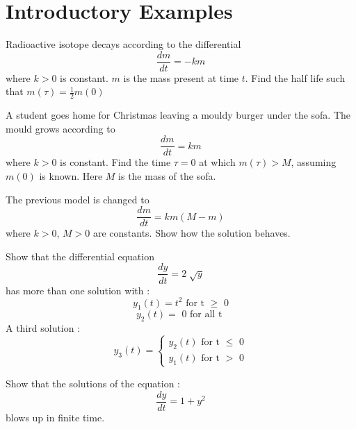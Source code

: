 
\chapter{Introductory Examples}

\begin{example} 
Radioactive isotope decays according to the differential $$\frac{dm}{dt} = -km$$ where $k > 0$ is constant. $m$ is the mass present at time $t$.
Find the half life such that $m(\tau) = \frac{1}{2}m(0)$
\end{example}
\bigskip

\begin{example}  A student goes home for Christmas leaving a mouldy burger under the sofa. The mould grows according to $$\frac{dm}{dt} = km$$ where $ k > 0$ is constant. Find the time $\tau = 0$ at which $m(\tau) > M$, assuming $m(0)$ is known. Here $M$ is the mass of the sofa.
\end{example}
\bigskip

\begin{example}  The previous model is changed to $$\frac{dm}{dt} = km(M-m)$$ where $k > 0$, $M > 0$ are constants. Show how the solution behaves.
\end{example}
\bigskip

\begin{example}  Show that the differential equation $$\frac{dy}{dt} = 2\sqrt[]{y}$$ has more than one solution with :
$$y_1(t) = t^2 \mbox{ for t } {\geq} \mbox{ 0}$$
$$y_2(t) = \mbox{ 0 for all t }$$
A third solution :
$$
y_3 (t) = \begin{cases}
y_2(t) \mbox{ for t } \leq \mbox{ 0} \\
y_1(t) \mbox{ for t } > \mbox{ 0} 
\end{cases} $$
\end{example}
\bigskip

\begin{example}
Show that the solutions of the equation : $$\frac{dy}{dt} = 1 + y^2$$ blows up in finite time.
\end{example}


\endinput
